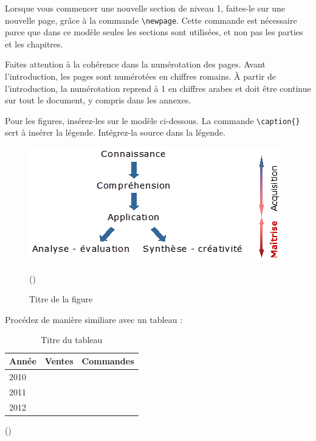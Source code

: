 Lorsque vous commencer une nouvelle section de niveau 1, faites-le sur une nouvelle page, grâce à la commande \verb?\newpage?. Cette commande est nécessaire parce que dans ce modèle seules les sections sont utilisées, et non pas les parties et les chapitres.

Faites attention à la cohérence dans la numérotation des pages. Avant l'introduction, les pages sont numérotées en chiffres romains. À partir de l'introduction, la numérotation reprend à 1 en chiffres arabes et doit être continue sur tout le document, y compris dans les annexes.

Pour les figures, insérez-les sur le modèle ci-dessous. La commande \verb?\caption{}? sert à insérer la légende. Intégrez-la source dans la légende.

\begin{figure}[H]
	\noindent \begin{centering}
		\caption{Titre de la figure}
		\bigskip{}
			\includegraphics{images/image3.png}\bigskip{}
	\par \end{centering}
	\noindent \begin{raggedleft}
		(\cite[22]{bertholet_livres_1890}) %
	\par \end{raggedleft}
\end{figure}

Procédez de manière similiare avec un tableau :

\begin{table}[H]
	\noindent \begin{centering}
	\caption{Titre du tableau}
	\bigskip{}
		\begin{tabular}{|m{}|m{}|m{0.4\textwidth}|}
			\hline
			\textbf{Année} & \textbf{Ventes} & \textbf{Commandes} \\
			\hline
			2010 &  &  \\
			\hline
			2011 &  &  \\
			\hline
			2012 & & \\
			\hline
		\end{tabular}
		\bigskip{}
	\par\end{centering}
	\noindent \begin{raggedleft}
		(\cite[22]{bertholet_livres_1890}) %
	\par\end{raggedleft}
\end{table}

